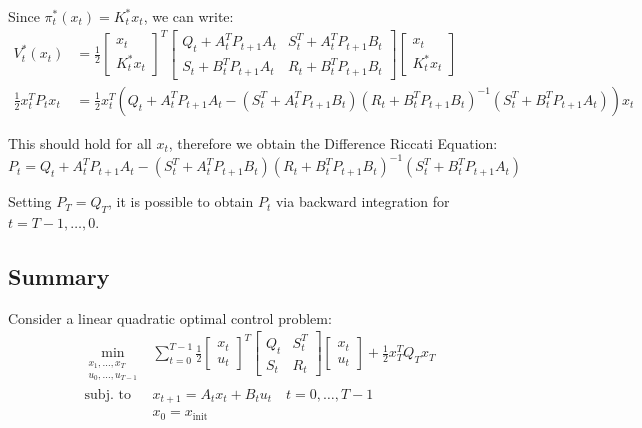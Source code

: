 \documentclass[openany]{book}
\theoremstyle{definition}
\theoremstyle{remark}
\begin{document}
Since $\pi_t^*(x_t) = K_t^*x_t$, we can write:
\begin{align*}
V_t^*(x_t) &= \frac{1}{2}\begin{bmatrix}
x_t \\ K_t^*x_t
\end{bmatrix}^T \begin{bmatrix}
Q_t + A_t^T P_{t+1} A_t & S_t^T + A_t^T P_{t+1} B_t\\
S_t + B_t^T P_{t+1} A_t & R_t + B_t^T P_{t+1} B_t
\end{bmatrix} \begin{bmatrix}
x_t \\ K_t^*x_t
\end{bmatrix}\\
\frac{1}{2}x_t^T P_tx_t &= \frac{1}{2}x_t^T(Q_t + A_t^T P_{t+1} A_t - (S_t^T + A_t^T P_{t+1} B_t)(R_t + B_t^T P_{t+1} B_t)^{-1}(S_t^T + B_t^T P_{t+1} A_t))x_t
\end{align*}

This should hold for all $x_t$, therefore we obtain the Difference Riccati Equation:
\[
P_t = Q_t + A_t^T P_{t+1} A_t - (S_t^T + A_t^T P_{t+1} B_t)(R_t + B_t^T P_{t+1} B_t)^{-1}(S_t^T + B_t^T P_{t+1} A_t)
\]

Setting $P_T = Q_T$, it is possible to obtain $P_t$ via backward integration for $t = T-1,\dots,0$.

\subsection{Summary}
Consider a linear quadratic optimal control problem:
\begin{align*}
\min_{\substack{x_1,\dots,x_T \\ u_0,\dots,u_{T-1}}} & \sum_{t=0}^{T-1} \frac{1}{2}\begin{bmatrix}
x_t \\ u_t
\end{bmatrix}^T \begin{bmatrix}
Q_t & S_t^T \\ S_t & R_t
\end{bmatrix} \begin{bmatrix}
x_t \\ u_t
\end{bmatrix} + \frac{1}{2}x_T^T Q_T x_T\\
\text{subj. to } & x_{t+1} = A_tx_t + B_tu_t \quad t=0,\dots,T-1\\
&x_0 = x_{\text{init}}
\end{align*}
\end{document}
